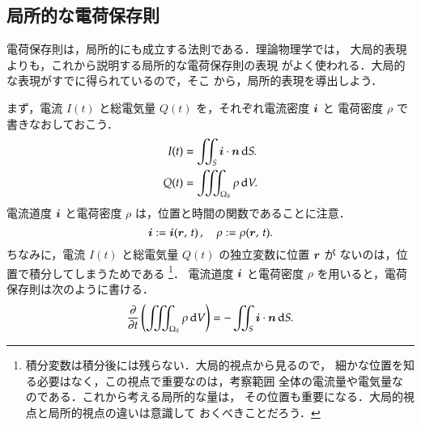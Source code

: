     \subsection{局所的な電荷保存則}
        電荷保存則は，局所的にも成立する法則である．理論物理学では，
        大局的表現よりも，これから説明する局所的な電荷保存則の表現
        がよく使われる．大局的な表現がすでに得られているので，そこ
        から，局所的表現を導出しよう．

        まず，電流 $I(t)$ と総電気量 $Q(t)$ を，それぞれ電流密度 $\boldsymbol{i}$ と
        電荷密度 $\rho$ で書きなおしておこう．
            \begin{align*}
                I(t)  &=  \int\mspace{-11mu}\int_{S} \boldsymbol{i} \cdot \boldsymbol{n} \,\mathrm{d} S. \\
                Q(t)  &=  \int\mspace{-11mu}\int\mspace{-11mu}\int_{\Omega_{S}} \rho \,\mathrm{d} V.
            \end{align*}
        電流道度 $\boldsymbol{i}$ と電荷密度 $\rho$ は，位置と時間の関数であることに注意．
            \begin{equation*}
                \boldsymbol{i} := \boldsymbol{i}(\boldsymbol{r},\,t)\,,\quad \rho := \rho(\boldsymbol{r},\,t).
            \end{equation*}
        ちなみに，電流 $I(t)$ と総電気量 $Q(t)$ の独立変数に位置 $\boldsymbol{r}$ が
        ないのは，位置で積分してしまうためである
            \footnote{
                積分変数は積分後には残らない．大局的視点から見るので，
                細かな位置を知る必要はなく，この視点で重要なのは，考察範囲
                全体の電流量や電気量なのである．これから考える局所的な量は，
                その位置も重要になる．大局的視点と局所的視点の違いは意識して
                おくべきことだろう．
            }．
        電流道度 $\boldsymbol{i}$ と電荷密度 $\rho$ を用いると，電荷保存則は次のように書ける．
            \begin{equation*}
                 \frac{\partial}{\partial t} \left( \int\mspace{-11mu}\int\mspace{-11mu}\int_{\Omega_{S}} \rho \,\mathrm{d} V \right)
               = - \int\mspace{-11mu}\int_{S} \boldsymbol{i} \cdot \boldsymbol{n} \,\mathrm{d} S.
            \end{equation*}

